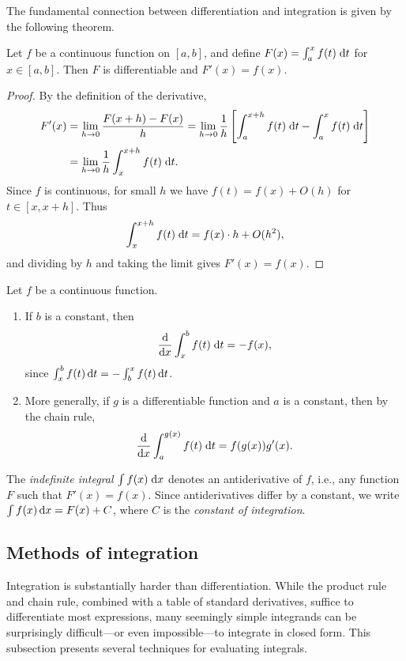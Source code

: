 \documentclass[a4paper]{article}
\begin{document}
The fundamental connection between differentiation and integration is given by the following theorem.

\begin{thm}
  Let $f$ be a continuous function on $[a, b]$, and define $F(x) = \int_a^x f(t)\;\mathrm{d} t$ for $x \in [a,b]$. Then $F$ is differentiable and $F'(x) = f(x)$.
\end{thm}

\begin{proof}
  By the definition of the derivative,
  \begin{align*}
    F'(x) &= \lim_{h\to 0}\frac{F(x+h) - F(x)}{h} = \lim_{h\to 0}\frac{1}{h}\left[\int_a^{x+h}f(t)\;\mathrm{d} t - \int_a^x f(t)\;\mathrm{d} t\right]\\
    &= \lim_{h\to 0} \frac{1}{h}\int_x^{x+h}f(t) \;\mathrm{d} t.
  \end{align*}
  Since $f$ is continuous, for small $h$ we have $f(t) = f(x) + O(h)$ for $t \in [x, x+h]$. Thus
  \[
    \int_x^{x+h}f(t)\;\mathrm{d} t = f(x) \cdot h + O(h^2),
  \]
  and dividing by $h$ and taking the limit gives $F'(x) = f(x)$.
\end{proof}
\begin{cor}
  Let $f$ be a continuous function.
  \begin{enumerate}
    \item If $b$ is a constant, then
    \[
      \frac{\mathrm{d}}{\mathrm{d} x}\int_x^b f(t)\;\mathrm{d} t = -f(x),
    \]
    since $\int_x^b f(t)\,\mathrm{d} t = -\int_b^x f(t)\,\mathrm{d} t$.
    \item More generally, if $g$ is a differentiable function and $a$ is a constant, then by the chain rule,
    \[
      \frac{\mathrm{d}}{\mathrm{d} x}\int_a^{g(x)} f(t)\;\mathrm{d} t = f(g(x))g'(x).
    \]
  \end{enumerate}
\end{cor}

\begin{notation}
  The \emph{indefinite integral} $\int f(x)\;\mathrm{d} x$ denotes an antiderivative of $f$, i.e., any function $F$ such that $F'(x) = f(x)$. Since antiderivatives differ by a constant, we write $\int f(x)\,\mathrm{d} x = F(x) + C$, where $C$ is the \emph{constant of integration}.
\end{notation}

\subsection{Methods of integration}
Integration is substantially harder than differentiation. While the product rule and chain rule, combined with a table of standard derivatives, suffice to differentiate most expressions, many seemingly simple integrands can be surprisingly difficult---or even impossible---to integrate in closed form. This subsection presents several techniques for evaluating integrals.
\end{document}
